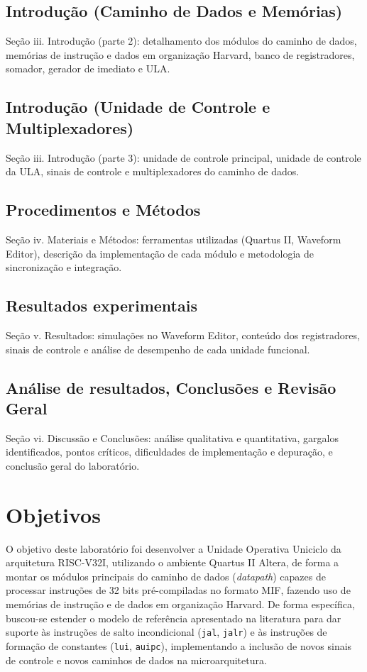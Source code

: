 \documentclass[conference]{IEEEtran}
\begin{document}
\subsection{Introdução (Caminho de Dados e Memórias)}
Seção iii. Introdução (parte 2): detalhamento dos módulos do caminho de dados, memórias de instrução e
dados em organização Harvard, banco de registradores, somador, gerador de imediato e ULA.

\subsection{Introdução (Unidade de Controle e Multiplexadores)}
Seção iii. Introdução (parte 3): unidade de controle principal, unidade de controle da ULA, sinais de
controle e multiplexadores do caminho de dados.

\subsection{Procedimentos e Métodos}
Seção iv. Materiais e Métodos: ferramentas utilizadas (Quartus II, Waveform Editor), descrição da
implementação de cada módulo e metodologia de sincronização e integração.

\subsection{Resultados experimentais}
Seção v. Resultados: simulações no Waveform Editor, conteúdo dos registradores, sinais de controle e
análise de desempenho de cada unidade funcional.

\subsection{Análise de resultados, Conclusões e Revisão Geral}
Seção vi. Discussão e Conclusões: análise qualitativa e quantitativa, gargalos identificados, pontos
críticos, dificuldades de implementação e depuração, e conclusão geral do laboratório.


\section{Objetivos}
O objetivo deste laboratório foi desenvolver a Unidade Operativa Uniciclo da arquitetura RISC-V32I,
utilizando o ambiente Quartus II Altera, de forma a montar os módulos principais do caminho de dados
(\textit{datapath}) capazes de processar instruções de 32 bits pré-compiladas no formato MIF, fazendo uso
de memórias de instrução e de dados em organização Harvard. De forma específica, buscou-se estender o
 modelo de referência
apresentado na literatura \cite{patterson2020computer} para dar suporte às instruções de salto incondicional
(\texttt{jal}, \texttt{jalr}) e às instruções de formação de constantes (\texttt{lui}, \texttt{auipc}),
implementando a inclusão de novos sinais de controle e novos caminhos de dados na microarquitetura.
\end{document}
